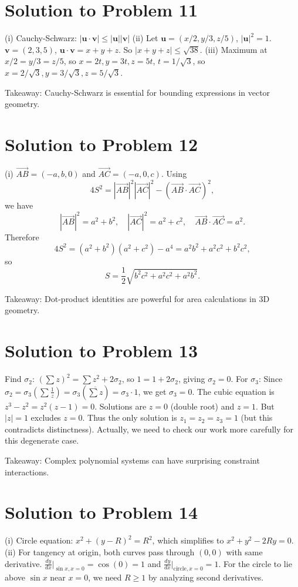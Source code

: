 \section*{Solution to Problem 11}
(i) Cauchy-Schwarz: $|\mathbf{u} \cdot \mathbf{v}| \leq |\mathbf{u}| |\mathbf{v}|$
(ii) Let $\mathbf{u} = (x/2, y/3, z/5)$, $|\mathbf{u}|^2 = 1$. $\mathbf{v} = (2, 3, 5)$, $\mathbf{u} \cdot \mathbf{v} = x + y + z$. So $|x + y + z| \leq \sqrt{38}$.
(iii) Maximum at $x/2 = y/3 = z/5$, so $x = 2t, y = 3t, z = 5t$, $t = 1/\sqrt{3}$, so $x = 2/\sqrt{3}, y = 3/\sqrt{3}, z = 5/\sqrt{3}$.

Takeaway: Cauchy-Schwarz is essential for bounding expressions in vector geometry.

\section*{Solution to Problem 12}
(i) $\vec{AB} = (-a, b, 0)$ and $\vec{AC} = (-a, 0, c)$. Using
\[
4S^2 = |\vec{AB}|^2 |\vec{AC}|^2 - (\vec{AB}\cdot\vec{AC})^2,
\]
we have
\[
|\vec{AB}|^2 = a^2+b^2,\quad |\vec{AC}|^2 = a^2+c^2,\quad \vec{AB}\cdot\vec{AC}=a^2.
\]
Therefore
\[
4S^2 = (a^2+b^2)(a^2+c^2)-a^4 = a^2b^2 + a^2c^2 + b^2c^2,
\]
so
\[
S = \frac{1}{2} \sqrt{b^2c^2 + a^2c^2 + a^2b^2}.
\]

Takeaway: Dot-product identities are powerful for area calculations in 3D geometry.

\section*{Solution to Problem 13}
Find $\sigma_2$: $(\sum z)^2 = \sum z^2 + 2\sigma_2$, so $1 = 1 + 2\sigma_2$, giving $\sigma_2 = 0$.
For $\sigma_3$: Since $\sigma_2 = \sigma_3(\sum \frac{1}{z}) = \sigma_3(\overline{\sum z}) = \sigma_3 \cdot 1$, we get $\sigma_3 = 0$.
The cubic equation is $z^3 - z^2 = z^2(z-1) = 0$.
Solutions are $z = 0$ (double root) and $z = 1$. But $|z| = 1$ excludes $z = 0$.
Thus the only solution is $z_1 = z_2 = z_3 = 1$ (but this contradicts distinctness).
Actually, we need to check our work more carefully for this degenerate case.

Takeaway: Complex polynomial systems can have surprising constraint interactions.

\section*{Solution to Problem 14}
(i) Circle equation: $x^2 + (y-R)^2 = R^2$, which simplifies to $x^2 + y^2 - 2Ry = 0$.
(ii) For tangency at origin, both curves pass through $(0,0)$ with same derivative.
$\frac{dy}{dx}|_{\sin x, x=0} = \cos(0) = 1$ and $\frac{dy}{dx}|_{\text{circle}, x=0} = 1$.
For the circle to lie above $\sin x$ near $x=0$, we need $R \geq 1$ by analyzing second derivatives.

